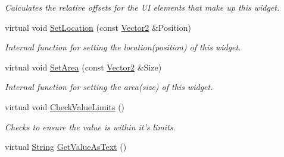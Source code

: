 \begin{DoxyCompactItemize}
\begin{DoxyCompactList}\small\item\em Calculates the relative offsets for the UI elements that make up this widget. \item\end{DoxyCompactList}\item 
\hypertarget{classphys_1_1UI_1_1Spinner_a27c0c8ab2d9dd70df0a2a4536718bbe8}{
virtual void \hyperlink{classphys_1_1UI_1_1Spinner_a27c0c8ab2d9dd70df0a2a4536718bbe8}{SetLocation} (const \hyperlink{classphys_1_1Vector2}{Vector2} \&Position)}
\label{classphys_1_1UI_1_1Spinner_a27c0c8ab2d9dd70df0a2a4536718bbe8}

\begin{DoxyCompactList}\small\item\em Internal function for setting the location(position) of this widget. \item\end{DoxyCompactList}\item 
\hypertarget{classphys_1_1UI_1_1Spinner_a79840ed511ddc21d4281dc145504916e}{
virtual void \hyperlink{classphys_1_1UI_1_1Spinner_a79840ed511ddc21d4281dc145504916e}{SetArea} (const \hyperlink{classphys_1_1Vector2}{Vector2} \&Size)}
\label{classphys_1_1UI_1_1Spinner_a79840ed511ddc21d4281dc145504916e}

\begin{DoxyCompactList}\small\item\em Internal function for setting the area(size) of this widget. \item\end{DoxyCompactList}\item 
\hypertarget{classphys_1_1UI_1_1Spinner_aa39b1f3c2b0ac1bfe6824f6423915918}{
virtual void \hyperlink{classphys_1_1UI_1_1Spinner_aa39b1f3c2b0ac1bfe6824f6423915918}{CheckValueLimits} ()}
\label{classphys_1_1UI_1_1Spinner_aa39b1f3c2b0ac1bfe6824f6423915918}

\begin{DoxyCompactList}\small\item\em Checks to ensure the value is within it's limits. \item\end{DoxyCompactList}\item 
\hypertarget{classphys_1_1UI_1_1Spinner_ac9cc6fde628120156d187b9d283579be}{
virtual \hyperlink{namespacephys_aa03900411993de7fbfec4789bc1d392e}{String} \hyperlink{classphys_1_1UI_1_1Spinner_ac9cc6fde628120156d187b9d283579be}{GetValueAsText} ()}
\label{classphys_1_1UI_1_1Spinner_ac9cc6fde628120156d187b9d283579be}


\end{DoxyCompactItemize}
